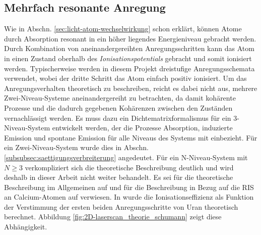 \subsection{Mehrfach
resonante Anregung}\label{subsec:mehrfach_resonante_anregung}
Wie in Abschn. \ref{sec:licht-atom-wechselwirkung} schon erklärt, können Atome
durch Absorption resonant in ein höher liegendes Energieniveau gebracht werden.
Durch Kombination von aneinandergereihten Anregungsschritten kann
das Atom in einen Zustand oberhalb des \textit{Ionisationspotentials} gebracht
und somit ionisiert werden. Typischerweise werden in diesem Projekt dreistufige
Anregungsschemata verwendet, wobei der dritte Schritt das Atom einfach
positiv ionisiert. Um das Anregungsverhalten theoretisch zu beschreiben, reicht
es dabei nicht aus, mehrere Zwei-Niveau-Systeme aneinandergereiht zu betrachten,
da damit kohärente Prozesse und die dadurch gegebenen Kohärenzen zwischen den
Zuständen vernachlässigt werden. Es muss dazu ein Dichtematrixformalismus für
ein 3-Niveau-System entwickelt werden, der die Prozesse Absorption, induzierte Emission und spontane Emission für alle
Niveaus des Systems mit einbezieht. Für ein
Zwei-Niveau-System wurde dies in Abschn.
\ref{subsubsec:saettigungsverbreiterung} angedeutet. Für ein N-Niveau-System mit
$N\geq3$ verkompliziert sich die theoretische Beschreibung deutlich und wird
deshalb in dieser Arbeit nicht weiter behandelt. Es sei für die theoretische Beschreibung im Allgemeinen auf \cite{blum:density_matrix_theory} und für die
Beschreibung in Bezug auf die RIS an Calcium-Atomen auf
\cite{noertershaeuser:1999:dissertation} verwiesen. In
\cite{schumann:2005:dissertation} wurde die Ionisationseffizienz als Funktion
der Verstimmung der ersten beiden Anregungsschritte von Uran theoretisch
berechnet. Abbildung \ref{fig:2D-laserscan_theorie_schumann} zeigt diese
Abhängigkeit.

